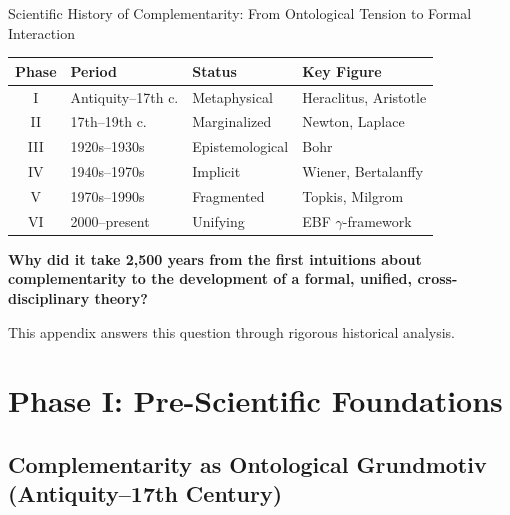 \begin{chapter}{Scientific History of Complementarity: From Ontological Tension to Formal Interaction}
\begin{tcolorbox}[
    colback=orange!5!white,
    colframe=orange!75!black,
    title={\textbf{Appendix Scope: Ziel / In-Scope / Out-of-Scope / Constraints}},
    fonttitle=\bfseries
]
\end{tcolorbox}



\begin{tcolorbox}[colback=yellow!5!white,colframe=yellow!75!black,title=\textbf{Quick Reference: Historical Phases}]
\small
\renewcommand{\arraystretch}{1.2}
\begin{tabular}{@{}clll@{}}
\toprule
\textbf{Phase} & \textbf{Period} & \textbf{Status} & \textbf{Key Figure} \\
\midrule
I & Antiquity--17th c. & Metaphysical & Heraclitus, Aristotle \\
II & 17th--19th c. & Marginalized & Newton, Laplace \\
III & 1920s--1930s & Epistemological & Bohr \\
IV & 1940s--1970s & Implicit & Wiener, Bertalanffy \\
V & 1970s--1990s & Fragmented & Topkis, Milgrom \\
VI & 2000--present & Unifying & EBF $\gamma$-framework \\
\bottomrule
\end{tabular}
\end{tcolorbox}

\begin{tcolorbox}[colback=red!5!white,colframe=red!75!black,title=\textbf{Fundamental Question}]
\textbf{Why did it take 2,500 years from the first intuitions about complementarity to the development of a formal, unified, cross-disciplinary theory?}

This appendix answers this question through rigorous historical analysis.
\end{tcolorbox}

\section{Phase I: Pre-Scientific Foundations}
\label{sec:phase-i}

\subsection{Complementarity as Ontological Grundmotiv (Antiquity--17th Century)}


\end{chapter}
